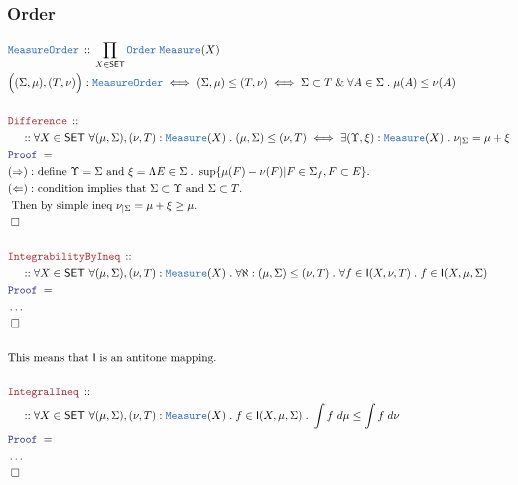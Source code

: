\documentclass[12pt]{scrartcl}
\newcommand{\TYPE}[1]{\textcolor{NavyBlue}{\mathtt{#1}}}
\newcommand{\LOGIC}[1]{\textcolor{Blue}{\mathtt{#1}}}
\newcommand{\THM}[1]{\textcolor{Maroon}{\mathtt{#1}}}
\renewcommand{\.}{\; . \;}
\newcommand{\Theorem}[2]{& \THM{#1} \, :: \, #2 \\ & \Proof = \\ }
\newcommand{\DeclareType}[2]{& \TYPE{#1} \, :: \, #2 \\}
\newcommand{\DefineNamedType}[4]{& #1 : \TYPE{#2} \iff #3 \iff #4 \\}
\newcommand{\NewLine}{\\ & \kern 1pc}
\newcommand{\Page}[1]{ \begin{align*} #1 \end{align*}   }
\newcommand{\NoProof}{ & \ldots \\ \EndProof}
\renewcommand{\And}{\; \& \;}
\newcommand{\QED}{\; \square}
\newcommand{\EndProof}{& \QED \\}
\newcommand{\Proof}{\LOGIC{Proof} \; }
\newcommand{\Explain}[1]{& \text{#1.} \\}
\newcommand{\SET}{\mathsf{SET}}
\newcommand{\Measure}{\TYPE{Measure}}
\newcommand{\Integrable}{\mathsf{I}}
\begin{document}
\subsubsection{Order}
\Page{
	\DeclareType{MeasureOrder}{\prod_{X \in \SET} \TYPE{Order} \; \Measure(X)}
	\DefineNamedType{\Big( (\Sigma,\mu),(T,\nu) \Big)}{MeasureOrder}
	{(\Sigma,\mu) \le (T,\nu)}{\Sigma \subset T  \And \forall A \in \Sigma \. \mu(A) \le \nu(A) }
	\\
	\Theorem{Difference}
	{
		\NewLine :: 		
		\forall X \in \SET \
		\forall (\mu,\Sigma),(\nu,T) : \Measure(X) \.
		(\mu,\Sigma) \le (\nu,T) \iff \exists (\Upsilon, \xi) : \Measure(X) \.
		\nu_{|\Sigma} = \mu + \xi	
	}
	\Explain{$(\Rightarrow):$ define $\Upsilon = \Sigma$ and 
		$\xi = \Lambda E \in \Sigma \.  \sup \{ \mu(F) - \nu(F) | F \in \Sigma_f, F \subset E \}$}
	\Explain{$(\Leftarrow):$ condition implies that $\Sigma \subset \Upsilon$ and 
		$\Sigma \subset T$}
	\Explain{ Then by simple ineq $\nu_{|\Sigma} = \mu + \xi \ge \mu$}
	\EndProof	
	\\
	\Theorem{IntegrabilityByIneq}
	{
		\NewLine ::
		\forall X \in \SET \
		\forall (\mu,\Sigma),(\nu,T) : \Measure(X) \.
		\forall \aleph : (\mu,\Sigma) \le (\nu,T) \.
		\forall f \in \Integrable(X,\nu,T) \.
		f \in \Integrable(X,\mu,\Sigma) 
	}
	\NoProof
	\\
	\Explain{This means that $\Integrable$ is an antitone mapping}
	\\
	\Theorem{IntegralIneq}
	{
		\NewLine ::
		\forall X \in \SET \
		\forall (\mu,\Sigma),(\nu,T) : \Measure(X) \.
		f \in \Integrable(X,\mu,\Sigma)  \.
		\int f \; d\mu \le \int f \; d\nu
	}	
	\NoProof
}
\newpage
\end{document}
